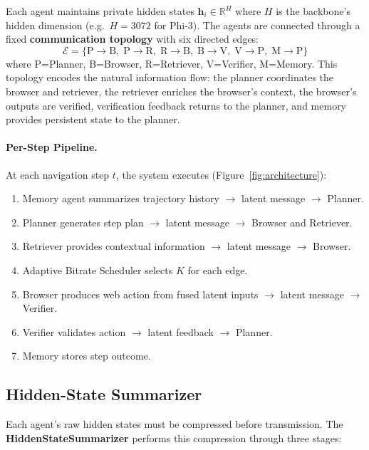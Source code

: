 \documentclass{article}
\newcommand{\RR}{\mathbb{R}}
\begin{document}
\noindent Each agent maintains private hidden states $\mathbf{h}_i \in \RR^H$ where $H$ is the backbone's hidden dimension (e.g.\ $H{=}3072$ for Phi-3).  The agents are connected through a fixed \textbf{communication topology} with six directed edges:
\[
\mathcal{E} = \{ \text{P}{\to}\text{B},\; \text{P}{\to}\text{R},\; \text{R}{\to}\text{B},\; \text{B}{\to}\text{V},\; \text{V}{\to}\text{P},\; \text{M}{\to}\text{P} \}
\]
where P=Planner, B=Browser, R=Retriever, V=Verifier, M=Memory.  This topology encodes the natural information flow: the planner coordinates the browser and retriever, the retriever enriches the browser's context, the browser's outputs are verified, verification feedback returns to the planner, and memory provides persistent state to the planner.

\paragraph{Per-Step Pipeline.}
At each navigation step $t$, the system executes (Figure~\ref{fig:architecture}):
\begin{enumerate}[leftmargin=*,itemsep=0pt]
\item Memory agent summarizes trajectory history $\to$ latent message $\to$ Planner.
\item Planner generates step plan $\to$ latent message $\to$ Browser and Retriever.
\item Retriever provides contextual information $\to$ latent message $\to$ Browser.
\item Adaptive Bitrate Scheduler selects $K$ for each edge.
\item Browser produces web action from fused latent inputs $\to$ latent message $\to$ Verifier.
\item Verifier validates action $\to$ latent feedback $\to$ Planner.
\item Memory stores step outcome.
\end{enumerate}

\subsection{Hidden-State Summarizer}
\label{sec:summarizer}

Each agent's raw hidden states must be compressed before transmission.  The \textbf{HiddenStateSummarizer} performs this compression through three stages:
\end{document}
